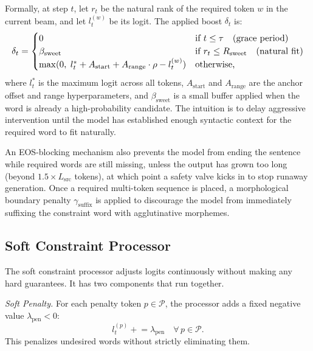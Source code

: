 \documentclass[conference]{IEEEtran}
\begin{document}
Formally, at step $t$, let $r_t$ be the natural rank of the required token $w$ in the current beam, and let $l_t^{(w)}$ be its logit. The applied boost $\delta_t$ is:
\begin{equation}
\resizebox{\columnwidth}{!}{$\displaystyle
\delta_t = \begin{cases}
    0 & \text{if } t \leq \tau \quad \text{(grace period)} \\
    \beta_{\text{sweet}} & \text{if } r_t \leq R_{\text{sweet}} \quad \text{(natural fit)} \\
    \max(0,\; l_t^{*} + A_{\text{start}} + A_{\text{range}} \cdot \rho - l_t^{(w)}) & \text{otherwise,}
\end{cases}
$}
\label{eq:anchor}
\end{equation}
where $l_t^{*}$ is the maximum logit across all tokens, $A_{\text{start}}$ and $A_{\text{range}}$ are the anchor offset and range hyperparameters, and $\beta_{\text{sweet}}$ is a small buffer applied when the word is already a high-probability candidate. The intuition is to delay aggressive intervention until the model has established enough syntactic context for the required word to fit naturally.

An EOS-blocking mechanism also prevents the model from ending the sentence while required words are still missing, unless the output has grown too long (beyond $1.5 \times L_{\text{src}}$ tokens), at which point a safety valve kicks in to stop runaway generation. Once a required multi-token sequence is placed, a morphological boundary penalty $\gamma_{\text{suffix}}$ is applied to discourage the model from immediately suffixing the constraint word with agglutinative morphemes.

\subsection{Soft Constraint Processor}

The soft constraint processor adjusts logits continuously without making any hard guarantees. It has two components that run together.

\emph{Soft Penalty.} For each penalty token $p \in \mathcal{P}$, the processor adds a fixed negative value $\lambda_{\text{pen}} < 0$:
\begin{equation}
    l_t^{(p)} \mathrel{+}= \lambda_{\text{pen}} \quad \forall\, p \in \mathcal{P}.
\end{equation}
This penalizes undesired words without strictly eliminating them.
\end{document}
